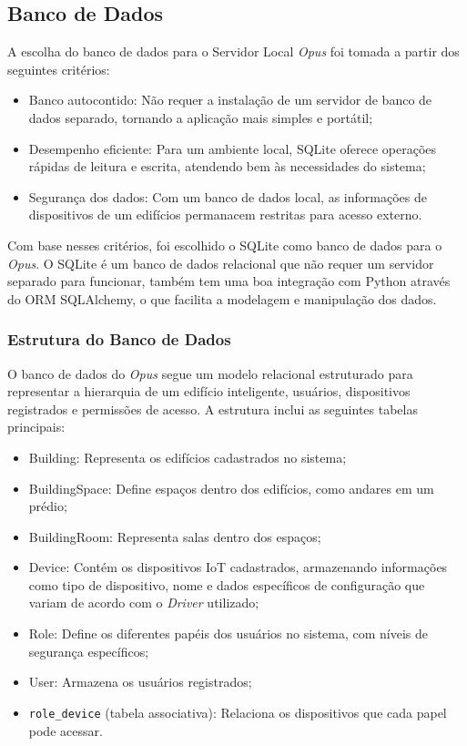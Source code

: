 \subsection{\textbf{Banco de Dados}}
A escolha do banco de dados para o Servidor Local \emph{Opus} foi tomada a partir dos seguintes critérios:
\begin{itemize}
    \item Banco autocontido: Não requer a instalação de um servidor de banco de dados separado, 
        tornando a aplicação mais simples e portátil;
    \item Desempenho eficiente: Para um ambiente local, SQLite oferece operações rápidas de leitura e escrita, 
        atendendo bem às necessidades do sistema;
    \item Segurança dos dados: Com um banco de dados local, as informações de dispositivos de um edifícios permanacem restritas para 
        acesso externo.
\end{itemize}

Com base nesses critérios, foi escolhido o SQLite como banco de dados para o \emph{Opus}.
O SQLite é um banco de dados relacional que não requer um servidor separado para funcionar, também tem uma boa 
integração com Python através do ORM SQLAlchemy, o que facilita a modelagem e manipulação dos dados.

\subsubsection{Estrutura do Banco de Dados}
O banco de dados do \emph{Opus} segue um modelo relacional estruturado para representar a hierarquia de um edifício inteligente,
usuários, dispositivos registrados e permissões de acesso. A estrutura inclui as seguintes tabelas principais:
\begin{itemize}
    \item Building: Representa os edifícios cadastrados no sistema;
    \item BuildingSpace: Define espaços dentro dos edifícios, como andares em um prédio;
    \item BuildingRoom: Representa salas dentro dos espaços;
    \item Device: Contém os dispositivos IoT cadastrados, armazenando informações como tipo de dispositivo, 
        nome e dados específicos de configuração que variam de acordo com o \emph{Driver} utilizado;
    \item Role: Define os diferentes papéis dos usuários no sistema, com níveis de segurança específicos;
    \item User: Armazena os usuários registrados;
    \item \texttt{role\_device} (tabela associativa): Relaciona os dispositivos que cada papel pode acessar.
\end{itemize}

